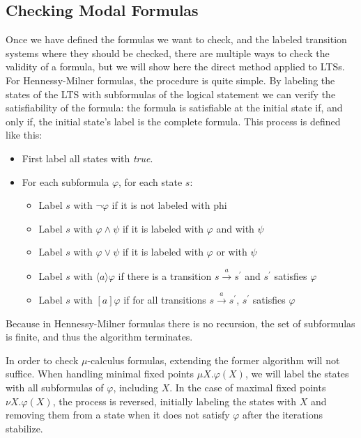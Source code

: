\documentclass[11pt]{article}
\theoremstyle{definition}
\theoremstyle{plain}
\let\temp\phi
\let\phi\varphi
\let\varphi\temp
\begin{document}
\subsection{Checking Modal Formulas}
Once we have defined the formulas we want to check, and the labeled transition systems where they should be checked, there are multiple ways to check the validity of a formula, but we will show here the direct method applied to LTSs.
For Hennessy-Milner formulas, the procedure is quite simple. By labeling the states of the LTS with subformulas of the logical statement we can verify the satisfiability of the formula: the formula is satisfiable at the initial state if, and only if, the initial state's label is the complete formula.
This process is defined like this:
\begin{itemize}
	\item First label all states with \textit{true}.
	\item For each subformula $\phi$, for each state $s$:
	\begin{itemize}
	\item Label $s$ with $\neg \phi$ if it is not labeled with phi
	\item Label $s$ with $\phi \wedge \psi$ if it is labeled with $\phi$ and with $\psi$
	\item Label $s$ with $\phi \vee \psi$ if it is labeled with $\phi$ or with $\psi$
	\item Label $s$ with $\langle a \rangle\phi$ if there is a transition $s\xrightarrow{a}s^\prime$ and $s^\prime$ satisfies $\phi$
	\item Label $s$ with $[a]\phi$ if for all transitions $s\xrightarrow{a}s^\prime$, $s^\prime$ satisfies $\phi$
	\end{itemize}
\end{itemize}

Because in Hennessy-Milner formulas there is no recursion, the set of subformulas is finite, and thus the algorithm terminates.

In order to check $ \mu $-calculus formulas, extending the former algorithm will not suffice. When handling minimal fixed points $ \mu X.\phi(X) $, we will label the states with all subformulas of $ \phi $, including $ X $. In the case of maximal fixed points $ \nu X.\phi(X) $, the process is reversed, initially labeling the states with $ X $ and removing them from a state when it does not satisfy $ \phi $ after the iterations stabilize.

\clearpage
\end{document}
